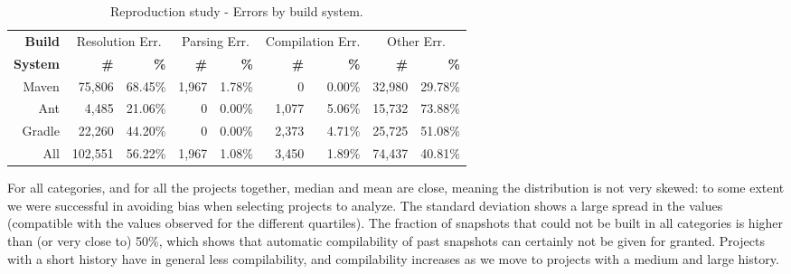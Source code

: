 \begin{table*}[h]

  \caption{Reproduction study - Errors by build system.}
  \label{table:results-reproduction-build-systems-errors}

\begin{center}
  \begin{tabular}{r|rrrrrrrr}
  \toprule
  \bf{Build}  & \multicolumn{2}{c}{Resolution Err.}  & \multicolumn{2}{c}{Parsing Err.}  & \multicolumn{2}{c}{Compilation Err.}  & \multicolumn{2}{c}{Other Err.} \\
  \bf{System}	& \bf{\#} & \bf{\%} & \bf{\#} & \bf{\%}  & \bf{\#} & \bf{\%}  & \bf{\#} & \bf{\%} \\
  \midrule
  Maven           &          75,806 &             68.45\%  &        1,967 &            1.78\% &                0 &                0.00\% &     32,980 &        29.78\% \\
  Ant             &           4,485 &             21.06\%  &            0 &            0.00\% &            1,077 &                5.06\% &     15,732 &        73.88\% \\
  Gradle          &          22,260 &             44.20\%  &            0 &            0.00\% &            2,373 &                4.71\% &     25,725 &        51.08\% \\
  \midrule
  All             &         102,551 &             56.22\%  &        1,967 &            1.08\% &            3,450&                1.89\% &     74,437 &        40.81\% \\
  \bottomrule
  \end{tabular}
\end{center}

\end{table*}

For all categories, and for all the projects together, median and mean are close, meaning the distribution is not very skewed: to some extent we were successful in avoiding bias when selecting projects to analyze.  The standard deviation shows a large spread in the values (compatible with the values observed for the different quartiles). The fraction of snapshots that could not be built in all categories is higher than (or very close to) 50\%, which shows that automatic compilability of past snapshots can certainly not be given for granted. Projects with a short history have in general less compilability, and compilability increases as we move to projects with a medium and large history.

